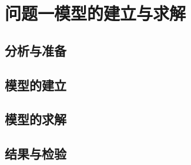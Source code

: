 %
%
\section{问题一模型的建立与求解}

\subsection{分析与准备}

\subsection{模型的建立}

\subsection{模型的求解}

\subsection{结果与检验}

